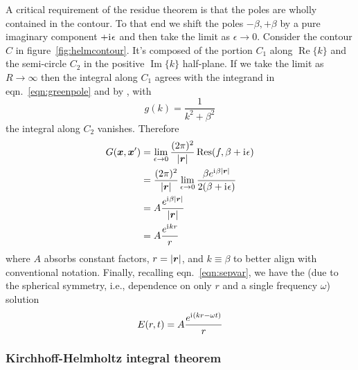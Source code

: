 A critical requirement of the residue theorem is that the poles are wholly contained in the contour.
%
To that end we shift the poles \(-\beta,+\beta\) by a pure imaginary component \(+\mathrm{i}\mkern1mu \epsilon\) and then take the limit as \(\epsilon \rightarrow 0\).
%
Consider the contour \(C\) in figure~\ref{fig:helmcontour}.
%
It's composed of the portion \(C_1\) along \(\operatorname{Re} \{k\}\) and the semi-circle \(C_2\) in the positive \(\operatorname{Im} \{k\}\) half-plane.
%
If we take the limit as \(R \rightarrow \infty\) then the integral along \(C_1\) agrees with the integrand in eqn.~\eqref{eqn:greenpole} and by , with 
%
\[
    g(k)=\frac{1}{k^2 + \beta^2}
\]
%
the integral along \(C_2\) vanishes.
%
Therefore
\begin{align}
    G(\bm{x}, \bm{x}') & = \lim_{\epsilon \rightarrow 0}  \frac{(2\pi)^2}{\abs{\bm{r}}} \operatorname {Res} (f, \beta+\mathrm{i}\mkern1mu \epsilon)                       \\
                 & = \frac{(2\pi)^2}{\abs{\bm{r}}} \lim_{\epsilon \rightarrow 0} \frac{\beta e^{\mathrm{i}\mkern1mu \beta \abs{\bm{r}}}}{ 2(\beta + \mathrm{i}\mkern1mu \epsilon) } \\
                 & = A \frac{e^{\mathrm{i}\mkern1mu \beta \abs{\bm{r}}}}{\abs{\bm{r}} } \\ 
                 & = A \frac{e^{\mathrm{i}\mkern1mu k r}}{r} \label{eqn:helmholtzsoln}
\end{align}
%
where \(A\) absorbs constant factors, \(r = \abs{\bm{r}}\), and \(k \equiv \beta\) to better align with conventional notation.
%
%
Finally, recalling eqn.~\eqref{eqn:sepvar}, we have the  (due to the spherical symmetry, i.e., dependence on only \(r\) and a single frequency \(\omega\)) solution
%
\begin{equation}
    E(r, t) = A\frac{e^{\mathrm{i}\mkern1mu (k r - \omega t)}}{r}\label{eqn:sphericalwavesoln}
\end{equation}
%

\subsubsection{Kirchhoff-Helmholtz integral theorem}

